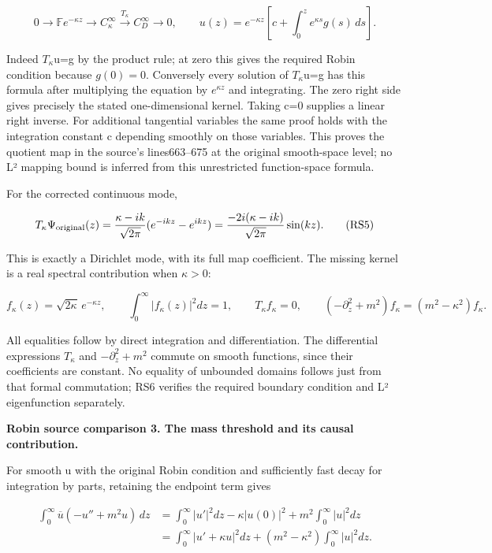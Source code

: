 \documentclass[
  11pt,
]{article}
\begin{document}
\[
 0\longrightarrow\mathbb F e^{-\kappa z}
 \longrightarrow C_\kappa^\infty
 \xrightarrow{T_\kappa} C_D^\infty\longrightarrow0,\qquad
 u(z)=e^{-\kappa z}\left[c+\int_0^z e^{\kappa s}g(s)\,ds\right].
 \tag{RS4}
\]

Indeed \(T_\kappa \)u=g by the product rule; at zero this gives the
required Robin condition because \(g(0)=0\). Conversely every solution
of \(T_\kappa \)u=g has this formula after multiplying the equation by
\ensuremath{e^{\kappa z}} and integrating. The zero right side gives precisely the
stated one-dimensional kernel. Taking c=0 supplies a linear right
inverse. For additional tangential variables the same proof holds with
the integration constant c depending smoothly on those variables. This
proves the quotient map in the source's lines663--675 at the original
smooth-space level; no L² mapping bound is inferred from this
unrestricted function-space formula.

For the corrected continuous mode,

\[
 T_\kappa\Psi_{\rm original}(z)
 =\frac{\kappa-ik}{\sqrt{2\pi}}(e^{-ikz}-e^{ikz})
 =\frac{-2i(\kappa-ik)}{\sqrt{2\pi}}\sin(kz).
 \tag{RS5}
\]

This is exactly a Dirichlet mode, with its full map coefficient. The
missing kernel is a real spectral contribution when \(\kappa >0\):

\[
 f_\kappa(z)=\sqrt{2\kappa}\,e^{-\kappa z},\qquad
 \int_0^\infty |f_\kappa(z)|^2dz=1,\qquad
 T_\kappa f_\kappa=0,\qquad
 (-\partial_z^2+m^2)f_\kappa=(m^2-\kappa^2)f_\kappa.
 \tag{RS6}
\]

All equalities follow by direct integration and differentiation. The
differential expressions \(T_\kappa \) and \ensuremath{-\partial_z^2+m^2} commute on smooth
functions, since their coefficients are constant. No equality of
unbounded domains follows just from that formal commutation; RS6
verifies the required boundary condition and L² eigenfunction
separately.

\textbf{Robin source comparison 3. The mass threshold and its causal
contribution.}

For smooth u with the original Robin condition and sufficiently fast
decay for integration by parts, retaining the endpoint term gives

\[
 \begin{split}
 \int_0^\infty\overline u(-u''+m^2u)\,dz
 &=\int_0^\infty|u'|^2dz-\kappa|u(0)|^2
                         +m^2\int_0^\infty|u|^2dz\\
 &=\int_0^\infty|u'+\kappa u|^2dz
                    +(m^2-\kappa^2)\int_0^\infty|u|^2dz.
 \end{split}
 \tag{RS7}
\]
\end{document}
